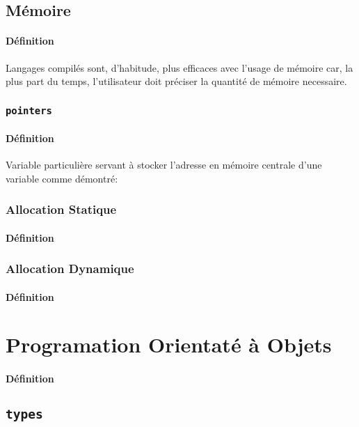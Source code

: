 \documentclass{article}
\begin{document}
\subsection{Mémoire}
\paragraph{Définition}Langages compilés sont, d'habitude, plus efficaces avec l'usage de mémoire car, la plus part du temps, l'utilisateur doit préciser la quantité de mémoire necessaire.
\subsubsection{\texttt{pointers}}
\paragraph{Définition}Variable particulière servant à stocker l'adresse en mémoire centrale d'une variable comme démontré:
\begin{scriptsize}
    \mycode
\end{scriptsize}

\subsubsection{Allocation Statique}
\paragraph{Définition}

\subsubsection{Allocation Dynamique}
\paragraph{Définition}


\section{Programation Orientaté à Objets}
\paragraph{Définition}

\subsection{\texttt{types}}
\end{document}
